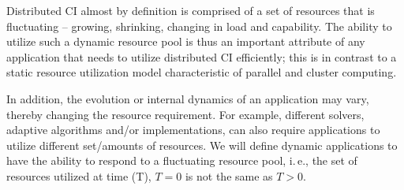 \documentclass[conference,final]{IEEEtran}
\newcommand{\jhanote}[1]{ {\textcolor{red} { ***shantenu: #1 }}}
\newcommand{\alnote}[1]{ {\textcolor{blue} { ***andre: #1 }}}
\newcommand{\alnote}[1]{}
\newcommand{\jhanote}[1]{}
\begin{document}
Distributed CI almost by definition is comprised of a set of resources
that is fluctuating -- growing, shrinking, changing in load and
capability.  The ability to utilize such a dynamic resource pool is
thus an important attribute of any application that needs to utilize
distributed CI efficiently; this is in contrast to a static resource
utilization model characteristic of parallel and cluster computing.

In addition, the evolution or internal dynamics of an application may
vary, thereby changing the resource requirement.
For example, different solvers, %
adaptive algorithms and/or implementations, can also require
applications to utilize different set/amounts of resources.
We will define dynamic applications to have the ability to respond to
a fluctuating resource pool, i.\,e., the set of resources utilized at
time (T), $T=0$ is not the same as $T>0$.








\end{document}
